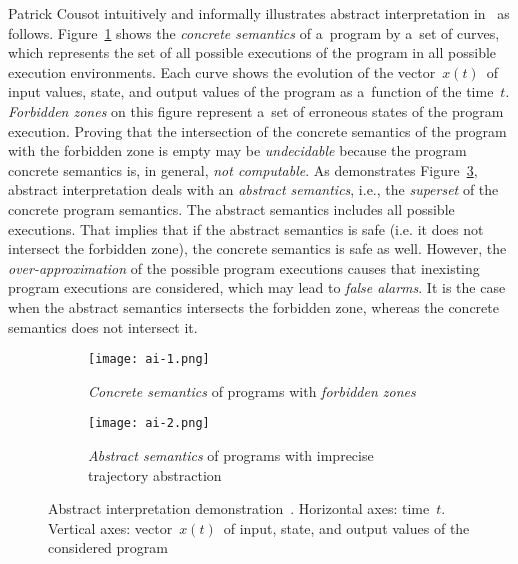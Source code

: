 Patrick Cousot intuitively and informally illustrates abstract
interpretation in~\cite{AIInNutshellCousot} as follows.
Figure~\ref{fig:ai1} shows the \emph{concrete semantics} of a~program
by a~set of curves, which represents the set of all possible executions
of the program in all possible execution environments. Each curve shows
the evolution of the vector~$ x(t) $~of input values, state, and
output values of the program as a~function of the time~$ t $.
\emph{Forbidden zones} on this figure represent a~set of erroneous states
of the program execution. Proving that the intersection of the concrete
semantics of the program with the forbidden zone is empty may be
\emph{undecidable} because the program concrete semantics is, in general,
\emph{not computable}. As demonstrates Figure~\ref{fig:ai2}, abstract
interpretation deals with an \emph{abstract semantics}, i.e., the
\emph{superset} of the concrete program semantics. The abstract semantics
includes all possible executions. That implies that if the abstract
semantics is safe (i.e. it does not intersect the forbidden zone), the
concrete semantics is safe as well. However, the \emph{over-approximation}
of the possible program executions causes that inexisting program executions
are considered, which may lead to \emph{false alarms}. It is the case when
the abstract semantics intersects the forbidden zone, whereas the concrete
semantics does not intersect it.

\begin{figure}[hbt]
    \centering

    \begin{subfigure}[hbt]{.45 \linewidth}
        \centering
        \texttt{[image: ai-1.png]}
        \caption{%
            \emph{Concrete semantics} of programs with
            \emph{forbidden zones}
        }
        \label{fig:ai1}
    \end{subfigure}
%
    \hfill
%
    \begin{subfigure}[hbt]{.45\linewidth}
        \centering
        \texttt{[image: ai-2.png]}
        \caption{%
            \emph{Abstract semantics} of programs with imprecise
            trajectory abstraction
        }
        \label{fig:ai2}
    \end{subfigure}

    \caption{%
        Abstract interpretation demonstration~\cite{AIInNutshellCousot}.
        Horizontal axes: time~$ t $. Vertical axes:
        vector~$ x(t) $~of input, state, and output values of the
        considered program
    }
\end{figure}

